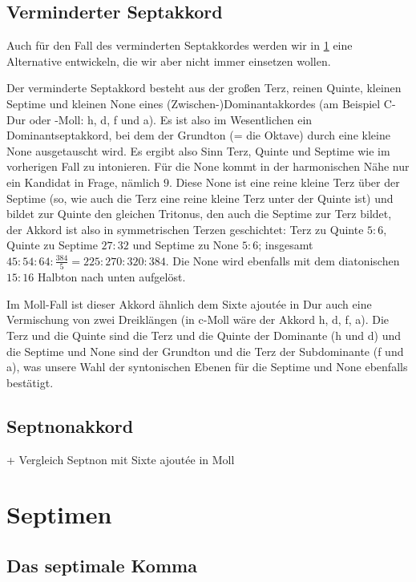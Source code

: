 \documentclass[ngerman,11pt]{scrartcl}
\begin{document}
\subsection{Verminderter Septakkord}

Auch für den Fall des verminderten Septakkordes werden wir in \cref{sec:sept}
eine Alternative entwickeln, die wir aber nicht immer einsetzen wollen.

Der verminderte Septakkord besteht aus der großen Terz, reinen Quinte, kleinen
Septime und kleinen None eines (Zwischen-)Dominantakkordes (am Beispiel C-Dur
oder -Moll: h, d, f und \flat a). Es ist also im Wesentlichen ein
Dominantseptakkord, bei dem der Grundton (= die Oktave) durch eine kleine
None ausgetauscht wird. Es ergibt also Sinn Terz, Quinte und Septime wie im
vorherigen Fall zu intonieren. Für die None kommt in der harmonischen Nähe nur
ein Kandidat in Frage, nämlich \flatp $9$. Diese None ist eine reine kleine Terz
über der Septime (so, wie auch die Terz eine reine kleine Terz unter der Quinte
ist) und bildet zur Quinte den gleichen Tritonus, den auch die Septime zur Terz
bildet, der Akkord ist also in symmetrischen Terzen geschichtet: Terz zu Quinte
$5:6$, Quinte zu Septime $27:32$ und Septime zu None $5:6$; insgesamt
$45:54:64:\frac{384}5 = 225:270:320:384$. Die None wird ebenfalls mit dem
diatonischen $15:16$ Halbton nach unten aufgelöst.

Im Moll-Fall ist dieser Akkord ähnlich dem Sixte ajoutée in Dur auch eine
Vermischung von zwei Dreiklängen (in c-Moll wäre der Akkord \naturalm h, d, f,
\flatp a). Die Terz und die Quinte sind die Terz und die Quinte der Dominante
(\naturalm h und d) und die Septime und None sind der Grundton und die Terz der
Subdominante (f und \flatp a), was unsere Wahl der syntonischen Ebenen für die
Septime und None ebenfalls bestätigt.

\subsection{Septnonakkord}

+ Vergleich Septnon mit Sixte ajoutée in Moll

\section{Septimen}
\label{sec:sept}

\subsection{Das septimale Komma}
\end{document}
